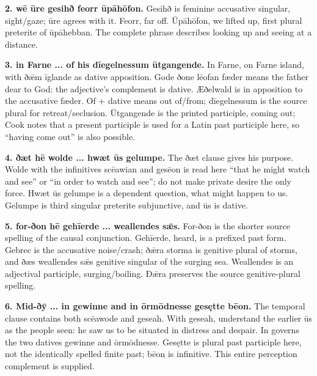 \textbf{2. wē ūre gesihð feorr ūpāhōfon.} Gesihð is feminine accusative singular, sight/\allowbreak{}gaze; ūre agrees with it. Feorr, far off. Ūpāhōfon, we lifted up, first plural preterite of ūpāhebban. The complete phrase describes looking up and seeing at a distance.

\textbf{3. in Farne ... of his dīegelnessum ūtgangende.} In Farne, on Farne island, with ðǣm īglande as dative apposition. Gode ðone lēofan fæder means the father dear to God: the adjective’s complement is dative. Æðelwald is in apposition to the accusative fæder. Of + dative means out of/\allowbreak{}from; dīegelnessum is the source plural for retreat/\allowbreak{}seclusion. Ūtgangende is the printed participle, coming out; Cook notes that a present participle is used for a Latin past participle here, so “having come out” is also possible.

\textbf{4. ðæt hē wolde ... hwæt ūs gelumpe.} The ðæt clause gives his purpose. Wolde with the infinitives scēawian and gesēon is read here “that he might watch and see” or “in order to watch and see”; do not make private desire the only force. Hwæt ūs gelumpe is a dependent question, what might happen to us. Gelumpe is third singular preterite subjunctive, and ūs is dative.

\textbf{5. for-ðon hē gehīerde ... weallendes sǣs.} For-ðon is the shorter source spelling of the causal conjunction. Gehīerde, heard, is a prefixed past form. Gebrec is the accusative noise/\allowbreak{}crash; ðǣra storma is genitive plural of storms, and ðæs weallendes sǣs genitive singular of the surging sea. Weallendes is an adjectival participle, surging/\allowbreak{}boiling. Ðǣra preserves the source genitive-plural spelling.

\textbf{6. Mid-ðȳ ... in gewinne and in ōrmōdnesse gesętte bēon.} The temporal clause contains both scēawode and geseah. With geseah, understand the earlier ūs as the people seen: he saw us to be situated in distress and despair. In governs the two datives gewinne and ōrmōdnesse. Gesętte is plural past participle here, not the identically spelled finite past; bēon is infinitive. This entire perception complement is supplied.

